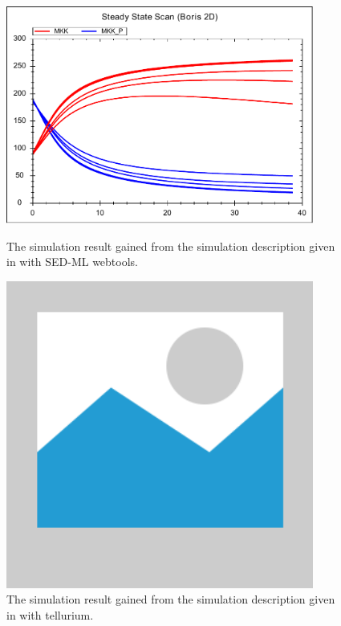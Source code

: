 \begin{figure}[ht]
    \centering
    \begin{minipage}{0.45\textwidth}
        \centering
        \includegraphics[width=0.9\textwidth]{examples/parameter-scan-2d/results/parameter-scan-2d}
        \caption{The simulation result gained from the simulation description given in  with SED-ML webtools.}
    \end{minipage}\hfill
    \begin{minipage}{0.45\textwidth}
        \centering
        \includegraphics[width=0.9\textwidth]{examples/placeholder}
        \caption{The simulation result gained from the simulation description given in  with tellurium.}
    \end{minipage}
    \label{fig:parameter-scan-2d}
\end{figure}

